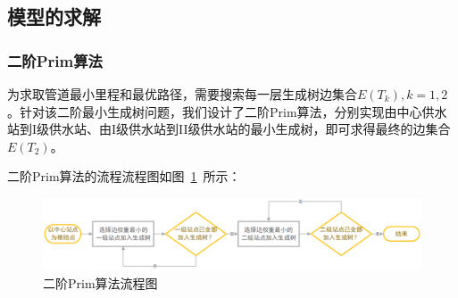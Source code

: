 \documentclass{whutmod}
\begin{document}
		\subsection{模型的求解}
			\subsubsection{二阶Prim算法}
		为求取管道最小里程和最优路径，需要搜索每一层生成树边集合$E(T_k),k=1,2$。针对该二阶最小生成树问题，我们设计了二阶Prim算法，分别实现由中心供水站到I级供水站、由I级供水站到II级供水站的最小生成树，即可求得最终的边集合$E(T_2)$。
		
		二阶Prim算法的流程流程图如图~\ref{awwwsd}~所示：
		\begin{figure}[H]
		\centering
		\includegraphics[width=\textwidth]{figures/a1.png}
		\caption{二阶Prim算法流程图}\label{awwwsd}
	\end{figure}
		
\end{document}
